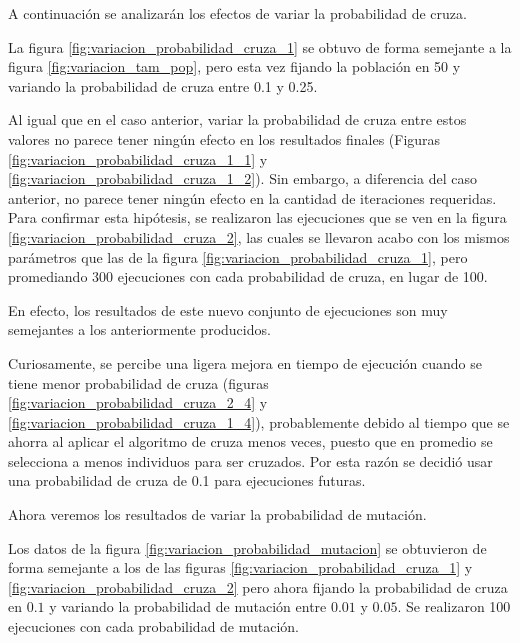 \documentclass[12pt]{article} %
\begin{document}
A continuación se analizarán los efectos de variar la probabilidad de cruza.



La figura \ref{fig:variacion_probabilidad_cruza_1} se obtuvo de forma semejante
a la figura \ref{fig:variacion_tam_pop}, pero esta vez fijando la población en 50
y variando la probabilidad de cruza entre 0.1 y 0.25.

Al igual que en el caso anterior, variar la probabilidad de cruza entre estos valores
no parece tener ningún efecto en los resultados finales (Figuras
\ref{fig:variacion_probabilidad_cruza_1_1} y \ref{fig:variacion_probabilidad_cruza_1_2}).
Sin embargo, a diferencia del caso anterior, no parece tener ningún efecto en
la cantidad de iteraciones requeridas. Para confirmar esta hipótesis, se realizaron
las ejecuciones que se ven en la figura \ref{fig:variacion_probabilidad_cruza_2},
las cuales se llevaron acabo con los mismos parámetros que las de la figura
\ref{fig:variacion_probabilidad_cruza_1}, pero promediando 300 ejecuciones con cada
probabilidad de cruza, en lugar de 100.

En efecto, los resultados de este nuevo conjunto de ejecuciones son muy semejantes
a los anteriormente producidos.

Curiosamente, se percibe una ligera mejora en tiempo de ejecución cuando se tiene
menor probabilidad de cruza (figuras \ref{fig:variacion_probabilidad_cruza_2_4} y
\ref{fig:variacion_probabilidad_cruza_1_4}), probablemente debido al tiempo que
se ahorra al aplicar el algoritmo de cruza menos veces, puesto que en promedio
se selecciona a menos individuos para ser cruzados. Por esta razón se decidió
usar una probabilidad de cruza de 0.1 para ejecuciones futuras.

Ahora veremos los resultados de variar la probabilidad de mutación.


Los datos de la figura \ref{fig:variacion_probabilidad_mutacion} se obtuvieron
de forma semejante a los de las figuras \ref{fig:variacion_probabilidad_cruza_1} y
\ref{fig:variacion_probabilidad_cruza_2} pero ahora fijando la probabilidad de cruza
en $0.1$ y variando la probabilidad de mutación entre $0.01$ y $0.05$. Se realizaron 100
ejecuciones con cada probabilidad de mutación.
\end{document}
